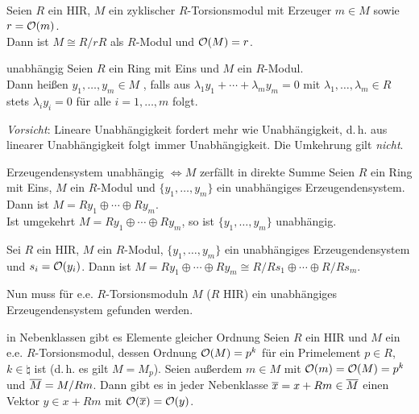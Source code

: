 \begin{Kor} \\
    Seien $R$ ein HIR, $M$ ein zyklischer $R$-Torsionsmodul mit Erzeuger
    $m \in M$ sowie $r = \mathcal{O}(m)$. \\
    Dann ist $M \cong R/rR$ als $R$-Modul und $\mathcal{O}(M) = r$.
\end{Kor}

\begin{Def}{unabhängig}
    Seien $R$ ein Ring mit Eins und $M$ ein $R$-Modul. \\
    Dann heißen $y_1, \dotsc, y_m \in M$ , falls aus
    $\lambda_1 y_1 + \dotsb + \lambda_m y_m = 0$ mit
    $\lambda_1, \dotsc, \lambda_m \in R$ stets $\lambda_i y_i = 0$ für
    alle $i = 1, \dotsc, m$ folgt.
\end{Def}

\begin{Bem}
    \emph{Vorsicht}:
    Lineare Unabhängigkeit fordert mehr wie Unabhängigkeit, d.\,h.
    aus linearer Unabhängigkeit folgt immer Unabhängigkeit.
    Die Umkehrung gilt \emph{nicht}.
\end{Bem}

\begin{Satz}{Erzeugendensystem unabhängig $\Leftrightarrow M$ zerfällt in
             direkte Summe}
    Seien $R$ ein Ring mit Eins, $M$ ein $R$-Modul und $\{y_1, \dotsc, y_m\}$
    ein unabhängiges Erzeugendensystem. \\
    Dann ist $M = Ry_1 \oplus \dotsb \oplus Ry_m$. \\
    Ist umgekehrt $M = Ry_1 \oplus \dotsb \oplus Ry_m$, so ist
    $\{y_1, \dotsc, y_m\}$ unabhängig.
\end{Satz}

\begin{Kor}
    Sei $R$ ein HIR, $M$ ein $R$-Modul, $\{y_1, \dotsc, y_m\}$
    ein unabhängiges Erzeugendensystem und $s_i = \mathcal{O}(y_i)$.
    Dann ist $M = Ry_1 \oplus \dotsb \oplus Ry_m \cong
    R/Rs_1 \oplus \dotsb \oplus R/Rs_m$.
\end{Kor}

\begin{Bem}
    Nun muss für e.e. $R$-Torsionsmoduln $M$ ($R$ HIR) ein unabhängiges
    Erzeugendensystem gefunden werden.
\end{Bem}

\begin{Lemma}{in Nebenklassen gibt es Elemente gleicher Ordnung}
    Seien $R$ ein HIR und $M$ ein e.e. $R$-Torsionsmodul, dessen Ordnung
    $\mathcal{O}(M) = p^k$ für ein Primelement $p \in R$, $k \in \natural$ ist
    (d.\,h. es gilt $M = M_p$).
    Seien außerdem $m \in M$ mit $\mathcal{O}(m) = \mathcal{O}(M) = p^k$ und
    $\overline{M} = M/Rm$.
    Dann gibt es in jeder Nebenklasse $\overline{x} = x + Rm \in \overline{M}$ einen Vektor
    $y \in x + Rm$ mit $\mathcal{O}(\overline{x}) = \mathcal{O}(y)$.
\end{Lemma}

